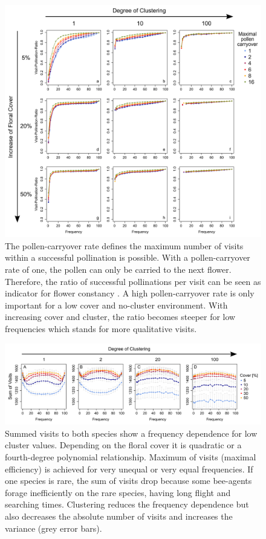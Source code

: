 \begin{figure} [!ht] %
	\centering
	\includegraphics[width=17cm]{Images/POC}
	\caption{The pollen-carryover rate defines the maximum number of visits within a successful pollination is possible. With a pollen-carryover rate of one, the pollen can only be carried to the next flower. Therefore, the ratio of successful pollinations per visit can be seen as indicator for flower constancy \citep{montgomery2009pollen}. A high pollen-carryover rate is only important for a low cover and no-cluster environment. With increasing cover and cluster, the ratio becomes steeper for low frequencies which stands for more qualitative visits.}
	\label{fig:POC}
\end{figure}

\begin{figure} [!h] %
	\centering
	\includegraphics[width=17cm]{Images/SUM}
	\caption{Summed visits to both species show a frequency dependence for low cluster values. Depending on the floral cover it is quadratic or a fourth-degree polynomial relationship. Maximum of visits (maximal efficiency) is achieved for very unequal or very equal frequencies. If one species is rare, the sum of visits drop because some bee-agents forage inefficiently on the rare species, having long flight and searching times. Clustering reduces the frequency dependence but also decreases the absolute number of visits and increases the variance (grey error bars).}
	\label{fig:SUM}
\end{figure}
